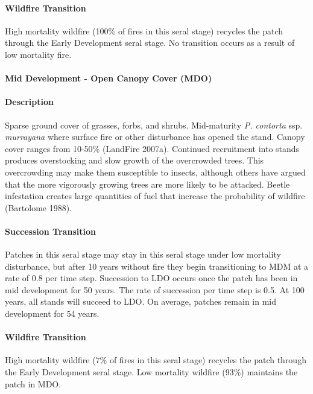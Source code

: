 \paragraph{Wildfire Transition} High mortality wildfire (100\% of fires in this seral stage) recycles the patch through the Early Development seral stage. No transition occurs as a result of low mortality fire.

\noindent\hrulefill


\paragraph{Mid Development - Open Canopy Cover (MDO)}

\paragraph{Description} Sparse ground cover of grasses, forbs, and shrubs. Mid-maturity \emph{P. contorta} ssp. \emph{murrayana} where surface fire or other disturbance has opened the stand. Canopy cover ranges from 10-50\% (LandFire 2007a).
Continued recruitment into stands produces overstocking and slow growth of the overcrowded trees. This overcrowding may make them susceptible to insects, although others have argued that the more vigorously growing trees are more likely to be attacked. Beetle infestation creates large quantities of fuel that increase the probability of wildfire (Bartolome 1988).


\paragraph{Succession Transition} Patches in this seral stage may stay in this seral stage under low mortality disturbance, but after 10 years without fire they begin transitioning to MDM at a rate of 0.8 per time step. Succession to LDO occurs once the patch has been in mid development for 50 years. The rate of succession per time step is 0.5. At 100 years, all stands will succeed to LDO. On average, patches remain in mid development for 54 years.

\paragraph{Wildfire Transition} High mortality wildfire (7\% of fires in this seral stage) recycles the patch through the Early Development seral stage. Low mortality wildfire (93\%) maintains the patch in MDO.

